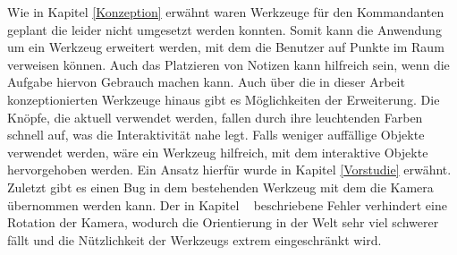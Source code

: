 Wie in Kapitel \ref{Konzeption} erwähnt waren Werkzeuge für den Kommandanten geplant die leider nicht umgesetzt werden konnten. Somit kann die Anwendung um ein Werkzeug erweitert werden, mit dem die Benutzer auf Punkte im Raum verweisen können. Auch das Platzieren von Notizen kann hilfreich sein, wenn die Aufgabe hiervon Gebrauch machen kann. Auch über die in dieser Arbeit konzeptionierten Werkzeuge hinaus gibt es Möglichkeiten der Erweiterung. Die Knöpfe, die aktuell verwendet werden, fallen durch ihre leuchtenden Farben schnell auf, was die Interaktivität nahe legt. Falls weniger auffällige Objekte verwendet werden, wäre ein Werkzeug hilfreich, mit dem interaktive Objekte hervorgehoben werden. Ein Ansatz hierfür wurde in Kapitel \ref{Vorstudie} erwähnt. Zuletzt gibt es einen Bug in dem bestehenden Werkzeug mit dem die Kamera übernommen werden kann. Der in Kapitel ~ beschriebene Fehler verhindert eine Rotation der Kamera, wodurch die Orientierung in der Welt sehr viel schwerer fällt und die Nützlichkeit der Werkzeugs extrem eingeschränkt wird.